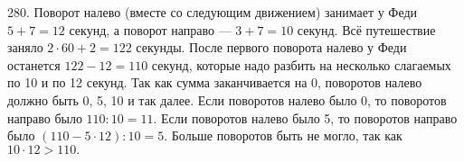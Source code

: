 280. Поворот налево (вместе со следующим движением) занимает у Феди $5+7=12$ секунд, а поворот направо --- $3+7=10$ секунд. Всё путешествие заняло $2\cdot60+2=122$ секунды. После первого поворота налево у Феди останется $122-12=110$ секунд, которые надо разбить на несколько слагаемых по 10 и по 12 секунд. Так как сумма заканчивается на 0, поворотов налево должно быть 0, 5, 10 и так далее. Если поворотов налево было 0, то поворотов направо было $110:10=11.$ Если поворотов налево было 5, то поворотов направо было $(110-5\cdot12):10=5.$ Больше поворотов быть не могло, так как $10\cdot12>110.$\\
